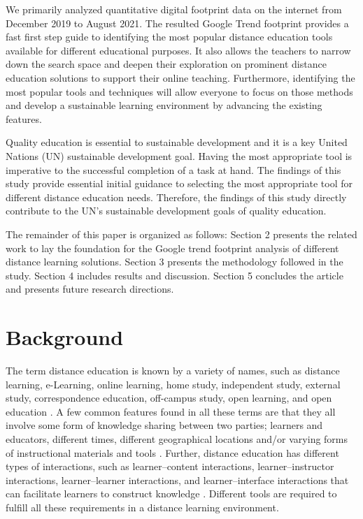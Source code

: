 \documentclass[11pt,a4paper,]{article}
\begin{document}
We primarily analyzed quantitative digital footprint data on the internet from December 2019 to August 2021. The resulted Google Trend footprint provides a fast first step guide to identifying the most popular distance education tools available for different educational purposes. It also allows the teachers to narrow down the search space and deepen their exploration on prominent distance education solutions to support their online teaching. Furthermore, identifying the most popular tools and techniques will allow everyone to focus on those methods and develop a sustainable learning environment by advancing the existing features.

Quality education is essential to sustainable development and it is a key United Nations (UN) sustainable development goal. Having the most appropriate tool is imperative to the successful completion of a task at hand. The findings of this study provide essential initial guidance to selecting the most appropriate tool for different distance education needs. Therefore, the findings of this study directly contribute to the UN's sustainable development goals of quality education.

The remainder of this paper is organized as follows: Section 2 presents the related work to lay the foundation for the Google trend footprint analysis of different distance learning solutions. Section 3 presents the methodology followed in the study. Section 4 includes results and discussion. Section 5 concludes the article and presents future research directions.

\hypertarget{background}{%
\section{Background}\label{background}}

The term distance education is known by a variety of names, such as distance learning, e-Learning, online learning, home study, independent study, external study, correspondence education, off-campus study, open learning, and open education \autocite{moore2011learning}. A few common features found in all these terms are that they all involve some form of knowledge sharing between two parties; learners and educators, different times, different geographical locations and/or varying forms of instructional materials and tools \autocite{moore2011learning}. Further, distance education has different types of interactions, such as learner--content interactions, learner--instructor interactions, learner--learner interactions, and learner--interface interactions that can facilitate learners to construct knowledge \autocite{wallace2003online}. Different tools are required to fulfill all these requirements in a distance learning environment.
\end{document}
